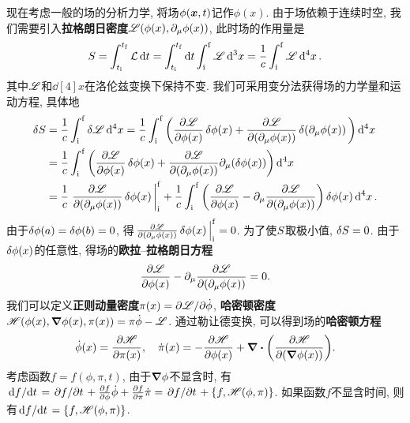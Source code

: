 现在考虑一般的场的分析力学, 将场$ \phi(\vb*{x},t) $记作$ \phi(x) $. 由于场依赖于连续时空, 我们需要引入\textbf{拉格朗日密度}$ \mathscr{L}(\phi(x),\partial_{\mu}\phi(x)) $, 此时场的作用量是
\begin{equation*}
    S = \int_{t_{\mathrm{i}}}^{t_{\mathrm{f}}} \mathcal{L} \dd{t} = \int_{t_{\mathrm{i}}}^{t_{\mathrm{f}}} \dd{t} \int_{\mathrm{i}}^{\mathrm{f}} \mathscr{L} \dd[3]{x} = \frac{1}{c} \int_{\mathrm{i}}^{\mathrm{f}} \mathscr{L} \dd[4]{x}.
\end{equation*}
其中$ \mathscr{L} $和$ \dd[4]{x} $在洛伦兹变换下保持不变. 我们可采用变分法获得场的力学量和运动方程, 具体地
\begin{align*}
    \var{\action} &= \frac{1}{c} \int_{\init}^{\fini} \var{\lagrden} \dd[4]{x} = \frac{1}{c} \int_{\init}^{\fini} \bigg( \pdv{\lagrden}{\phi(x)}\var{\phi(x)} + \pdv{\lagrden}{(\partial_{\mu} \phi(x))}\var{(\partial_{\mu} \phi(x))} \bigg) \dd[4]{x} \\
    &= \frac{1}{c} \int_{\init}^{\fini} \bigg( \pdv{\lagrden}{\phi(x)}\var{\phi(x)} + \pdv{\lagrden}{(\partial_{\mu} \phi(x))} \partial_{\mu}(\var{\phi(x)}) \bigg) \dd[4]{x}\\
    &= \frac{1}{c} \eval{\pdv{\lagrden}{(\partial_{\mu} \phi(x))} \var{\phi(x)}}_{\init}^{\fini} + \frac{1}{c} \int_{\init}^{\fini} \bigg( \pdv{\lagrden}{\phi(x)} - \partial_{\mu} \pdv{\lagrden}{(\partial_{\mu} \phi(x))} \bigg)\var{\phi(x)} \dd[4]{x}.
\end{align*}
由于$ \var{\phi(a)}=\var{\phi(b)}=0 $, 得$ \eval{\pdv{\lagrden}{(\partial_{\mu} \phi(x))} \var{\phi(x)}}_{\init}^{\fini}=0 $. 为了使$ S $取极小值, $ \var{S}=0 $. 由于$ \var{\phi(x)} $的任意性, 得场的\textbf{欧拉}--\textbf{拉格朗日方程}
\begin{equation}
    \pdv{\mathscr{L}}{\phi(x)} - \partial_{\mu}\pdv{\mathscr{L}}{(\partial_{\mu} \phi(x))} = 0.
\end{equation}
我们可以定义\textbf{正则动量密度}$ \pi(x) = {\partial \mathscr{L}}/{\partial \dot{\phi}} $, \textbf{哈密顿密度}$ \mathscr{H}(\phi(x),\grad{\phi(x)},\pi(x)) = \pi\dot{\phi} - \mathscr{L} $. 通过勒让德变换, 可以得到场的\textbf{哈密顿方程}
\begin{equation}
    \dot{\phi}(x) = \pdv{\mathscr{H}}{\pi(x)}, \quad \dot{\pi}(x) = - \pdv{\mathscr{H}}{\phi(x)} + \div {\bigg(\pdv{\mathscr{H}}{(\grad{\phi(x)})}\bigg)}.
\end{equation}
考虑函数$ f=f(\phi,\pi,t) $, 由于$ \grad{\phi} $不显含时, 有$ \dv*{f}{t} = \pdv*{f}{t} + \pdv{f}{\phi}\dot{\phi}+\pdv{f}{\pi}\dot{\pi} = \pdv*{f}{t}+\pb{f}{\hamiden(\phi,\pi)} $. 如果函数$ f $不显含时间, 则有$ \dv*{f}{t} = \pb{f}{\hamiden(\phi,\pi)} $.

